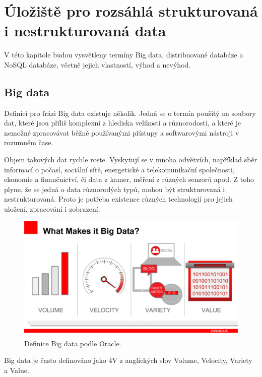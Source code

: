 \chapter{Úložiště pro rozsáhlá strukturovaná i nestrukturovaná data}
V této kapitole budou vysvětleny termíny Big data, distribuované databáze a NoSQL databáze, včetně jejich vlastností, výhod a nevýhod.

\section{Big data}
Definicí pro frázi Big data existuje několik. Jedná se o termín použitý na soubory dat, které jsou příliš komplexní z hlediska velikosti a různorodosti, a které je nemožné zpracovávat běžně používanými přístupy a softwarovými nástroji v rozumném čase.

Objem takových dat rychle roste. Vyskytují se v mnoha odvětvích, například sběr informací o počasí, sociální sítě, energetické a telekomunikační společnosti, ekonomie a finančnictví, či data z kamer, měření z různých senzorů apod. Z toho plyne, že se jedná o data různorodých typů, mohou být strukturovaná i nestrukturovaná. Proto je potřeba existence různých technologií pro jejich uložení, zpracování i zobrazení.

\begin{figure}[!h]
  \centering
  \includegraphics[width=12.5cm]{template-fig/what_makes_data_big_data.pdf}
  \caption{Definice Big data podle Oracle. \cite{johanBigData}}
  \label{FIG_BigData}
\end{figure}

\noindent Big data je často definováno jako 4V z anglických slov Volume, Velocity, Variety a Value. \cite{oracleBigData}


